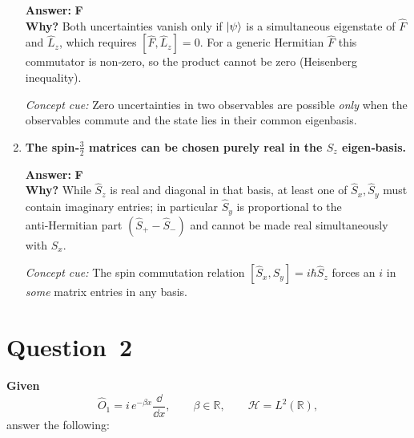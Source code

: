 \documentclass[12pt]{article}
\begin{document}
\begin{enumerate}[label=\textbf{\alph*)},itemsep=1.2\baselineskip]
      \textbf{Answer:} \textbf{F}\\
      \textbf{Why?}  Both uncertainties vanish only if $\ket{\psi}$ is a simultaneous
      eigenstate of \(\hat F\) and \(\hat L_z\), which requires
      $[\hat F,\hat L_z]=0$.  For a generic Hermitian $\hat F$ this commutator is
      non‑zero, so the product cannot be zero (Heisenberg
      inequality).\par
      \emph{Concept cue:}  Zero uncertainties in two observables are possible
      \emph{only} when the observables commute and the state lies in their common
      eigenbasis.

\item \textbf{The spin‑$\tfrac{3}{2}$ matrices can be chosen purely real in the
      $S_z$ eigen‑basis.}

      \textbf{Answer:} \textbf{F}\\
      \textbf{Why?}  While $\hat S_z$ is real and diagonal in that basis,
      at least one of $\hat S_x,\hat S_y$ must contain imaginary entries;
      in particular $\hat S_y$ is proportional to the anti‑Hermitian part
      $(\hat S_+-\hat S_-)$ and cannot be made real simultaneously with
      $\hat S_x$.\par
      \emph{Concept cue:}  The spin commutation relation
      $[\hat S_x,\hat S_y]=i\hbar\hat S_z$ forces an $i$ in \emph{some}
      matrix entries in any basis.

\end{enumerate}









\newpage
\section*{Question 2}

\textbf{Given}
\[
\hat O_{1}= i\,e^{-\beta x}\frac{\dd}{\dd x},
\qquad \beta\in\mathbb R,\qquad
\mathcal H=L^{2}(\mathbb R),
\]
answer the following:
\end{document}
